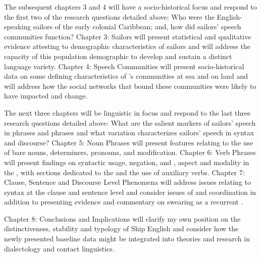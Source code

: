 The subsequent chapters 3 and 4 will have a socio-historical focus and respond to the first two of the research questions detailed above: Who were the English-speaking sailors of the early colonial Caribbean; and, how did sailors’ speech communities function? Chapter 3: Sailors will present statistical and qualitative evidence attesting to demographic characteristics of sailors and will address the capacity of this population demographic to develop and sustain a distinct language variety. Chapter 4: Speech Communities will present socio-historical data on some defining characteristics of ’s communities at sea and on land and will address how the social networks that bound these communities were likely to have impacted  and change.  



The next three chapters will be linguistic in focus and respond to the last three research questions detailed above: What are the salient markers of sailors’ speech in  phrases and  phrases and what variation characterizes sailors’ speech in syntax and discourse? Chapter 5: Noun Phrases will present features relating to the use of bare nouns, determiners, pronouns, and  modification. Chapter 6: Verb Phrases will present findings on syntactic  usage, negation, and , aspect and modality in the , with sections dedicated to the  and the use of auxiliary verbs. Chapter 7: Clause, Sentence and Discourse Level Phenomena will address issues relating to syntax at the clause and sentence level and consider issues of  and coordination in addition to presenting evidence and commentary on swearing as a recurrent .



Chapter 8: Conclusions and Implications will clarify my own position on the distinctiveness, stability and typology of Ship English and consider how the newly presented baseline data might be integrated into theories and research in dialectology and contact linguistics.


  